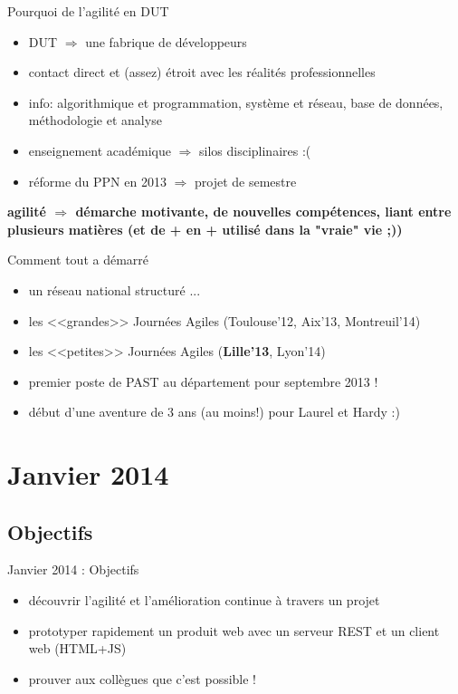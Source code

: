 \documentclass{beamer}
\begin{document}
\begin{frame}{Pourquoi de l'agilité en DUT}
   \begin{itemize}
    \item DUT $\Rightarrow$ une fabrique de développeurs
    \item contact direct et (assez) étroit avec les réalités professionnelles
    \item info: algorithmique et programmation, système et réseau, base de données, méthodologie et analyse
    \item enseignement académique $\Rightarrow$ silos disciplinaires :(
    \item réforme du PPN en 2013 $\Rightarrow$ projet de semestre
   \end{itemize}
   \textbf{agilité $\Rightarrow$ démarche motivante, de nouvelles compétences, liant entre plusieurs  matières (et de + en + utilisé dans la "vraie" vie ;))}
\end{frame}

\begin{frame}{Comment tout a démarré}
   \begin{itemize}
     \item un réseau national structuré ...
     \item les <<grandes>> Journées Agiles (Toulouse'12, Aix'13, Montreuil'14)
     \item les <<petites>> Journées Agiles (\textbf{Lille'13}, Lyon'14)
     \item premier poste de PAST au département pour septembre 2013 !
     \item début d'une aventure de 3 ans (au moins!) pour Laurel et Hardy :)
   \end{itemize}
\end{frame}


\section{Janvier 2014}
\subsection{Objectifs}
\begin{frame}{Janvier 2014 : Objectifs}

  \begin{itemize}
    \item découvrir l'agilité et l'amélioration continue à travers un projet 
    \item prototyper rapidement un produit web avec un serveur REST et un client web (HTML+JS)
    \item prouver aux collègues que c'est possible !
  \end{itemize}
\end{frame}
\end{document}
